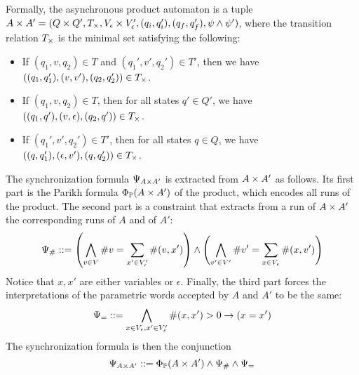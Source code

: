 \documentclass[sigplan,review,anonymous]{acmart}\settopmatter{printfolios=true,printccs=false,printacmref=false}
\begin{document}
Formally, the asynchronous product automaton is a tuple $A \times A' = (Q\times Q', T_\times, V_\epsilon \times V'_\epsilon, (q_i,q_i'),(q_f,q_f'),\psi\land\psi')$, where the transition relation $T_\times$ is the minimal set satisfying the following:
%
\begin{itemize}
\item If $(q_1,v,q_2) \in T$ and $(q_1',v',q_2') \in T'$, then we have $((q_1,q_1'),(v,v'),(q_2,q_2'))\in T_\times$.
\item If $(q_1,v,q_2) \in T$, then for all states $q'\in Q'$, we have $((q_1,q'),(v,\epsilon),(q_2,q'))\in T_\times$.
\item If $(q_1',v',q_2') \in T'$, then for all states $q\in Q$, we have $((q,q_1'),(\epsilon,v'),(q,q_2'))\in T_\times$.
\end{itemize}	
%
The synchronization formula $\Psi_{A \times A'}$ is extracted from $A \times A'$ as follows.
Its first part is the Parikh formula $\Phi_{\mathbb{P}}(A \times A')$ of the product, which encodes all runs of the product.
%
The second part is a constraint that extracts from a run of $A \times A'$ the corresponding runs of $A$ and of $A'$:
$$ \Psi_{\#} ::= 
\left(\bigwedge_{v\in V}\#v = \sum_{x' \in V'_\epsilon} \#{(v,x')}\right)
\land
\left(\bigwedge_{v'\in V'} \#v' = \sum_{x \in V_\epsilon} \#{(x,v')}\right)
$$
Notice that $x,x'$ are either variables or $\epsilon$.
Finally, the third part forces the interpretations of the parametric words accepted by $A$ and $A'$ to be the same:
$$ \Psi_= ::=
\bigwedge_{x\in V_\epsilon,x'\in V'_\epsilon} \#(x,x')>0 \rightarrow (x=x')
$$
The synchronization formula is then the conjunction 
$$
\Psi_{A \times A'} ::= \Phi_{\mathbb{P}}(A \times A') \land \Psi_{\#} \land \Psi_=
$$
\end{document}
